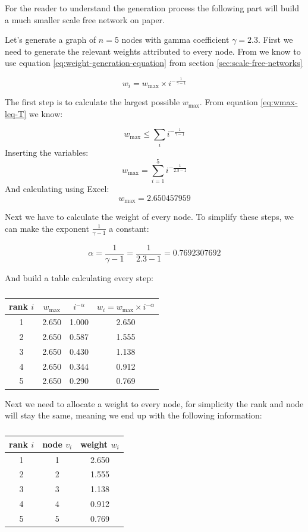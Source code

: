 \documentclass[12pt, a4paper]{article}   %
\begin{document}
For the reader to understand the generation process the following part will build a much smaller scale free network on paper. 

Let's generate a graph of \( n=5 \) nodes with gamma coefficient \( \gamma = 2.3 \). First we need to generate the relevant weights attributed to every node. From \textcite{chungAverageDistancesRandom2002} we know to use equation \ref{eq:weight-generation-equation} from section \ref{sec:scale-free-networks}

\[
    w_i = w_{\text{max}} \times i^{ -\frac{1}{\gamma-1}}
\]

The first step is to calculate the largest possible \( w_{\text{max}} \). From equation \ref{eq:wmax-leq-T} we know: 

\[
w_{\text{max}} \leq \sum_{i}{i^{ -\frac{1}{\gamma-1}}}
\]
Inserting the variables: 
\[
w_{\text{max}} = \sum_{i=1}^{5}{i^{ -\frac{1}{2.3-1}}}
\]
And calculating using Excel:
\[
w_{\text{max}} = 2.650457959
\]

Next we have to calculate the weight of every node. To simplify these steps, we can make the exponent \( \frac{1}{\gamma-1} \) a constant:

\[ \alpha = \frac{1}{\gamma-1} = \frac{1}{2.3-1} = 0.7692307692 \]

And build a table calculating every step:




\begin{table}[htbp]
\centering
\label{tab:rank-weights}
\begin{tabular}{c S[table-format=1.3] S[table-format=1.3] S[table-format=1.3]}
\toprule
{rank \(i\)} & {\(w_{\text{max}}\)} & {\(i^{-\alpha}\)} & {\(w_i = w_{\text{max}} \times i^{-\alpha}\)} \\
 & 2.650 & 1.000 & 2.650 \\
2 & 2.650 & 0.587 & 1.555 \\
3 & 2.650 & 0.430 & 1.138 \\
4 & 2.650 & 0.344 & 0.912 \\
5 & 2.650 & 0.290 & 0.769 \\
\bottomrule
\end{tabular}
\caption{}
\end{table}

Next we need to allocate a weight to every node,  for simplicity the rank and node will stay the same, meaning we end up with the following information: 


\begin{table}[htbp]
\centering
\label{tab:node-weight-allocation}
\begin{tabular}{c S[table-format=1.3] S[table-format=1.3]}
\toprule
{rank \(i\)} & {node \( v_i \)} & {weight \( w_i \)} \\
 & 1 & 2.650 \\
2 & 2 & 1.555 \\
3 & 3 & 1.138 \\
4 & 4 & 0.912 \\
5 & 5 & 0.769 \\
\bottomrule
\end{tabular}
\caption{}
\end{table}
\end{document}

